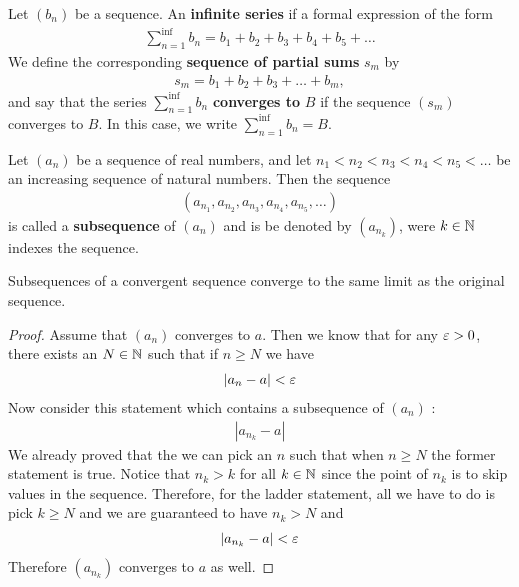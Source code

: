 \begin{definition}
	Let $\left( b_n \right) $ be a sequence. An \textbf{infinite series} if a formal expression of the form
	\begin{align}
		\sum_{n=1}^{\inf } b_n = b_1 + b_2 + b_3 + b_4 + b_5 + \ldots
	\end{align}
	We define the corresponding \textbf{sequence of partial sums} $s_m$ by
	\begin{align}
		s_m = b_1 + b_2 + b_3 + \ldots + b_m,
	\end{align}
	and say that the series $\sum_{n=1}^{\inf } b_n$ \textbf{converges to} $B$ if the sequence $\left( s_m \right) $ converges to $B$. In this case, we write $\sum_{n=1}^{\inf } b_n = B$. 
\end{definition}

\begin{definition}[Subsequence]
	Let $\left( a_n \right) $ be a sequence of real numbers, and let $n_{1} < n_2 < n_3 < n_4 < n_5 < \ldots$ be an increasing sequence of natural numbers. Then the sequence 
	\begin{align}
		\left( a_{n_{1}}, a_{n_{2}}, a_{n_{3}}, a_{n_{4}}, a_{n_{5}}, \ldots \right) 
	\end{align}
	is called a \textbf{subsequence} of $\left( a_n \right) $ and is be denoted by $\left( a_{n_{k}} \right) $, were $k \in  \mathbb{N}$ indexes the sequence.
\end{definition}

\begin{theorem}
	Subsequences of a convergent sequence converge to the same limit as the original sequence.
\end{theorem}

\begin{proof}
	Assume that $\left( a_n \right) $ converges to $a$. Then we know that for any $\e > 0$, there exists an $N \in \mathbb{N}$ such that if $n \ge N$ we have
	\begin{align}
		\left|a_n - a\right| < \e
	\end{align}
	Now consider this statement which contains a subsequence of  $\left( a_n \right) $ :
	\begin{align}
		\left|a_{n_{k}} - a\right|
	\end{align}
	We already proved that the we can pick an $n$ such that when $n \ge N$ the former statement is true. Notice that  $n_k > k$ for all $k \in \mathbb{N}$ since the point of $n_k$ is to skip values in the sequence. Therefore, for the ladder statement, all we have to do is pick $k \ge N$ and we are guaranteed to have $n_k > N$ and
		\begin{align}
			\left|a_{n_{k}} - a\right| < \e
		\end{align}
	Therefore $\left( a_{n_{k}} \right) $ converges to $a$ as well.
\end{proof}

